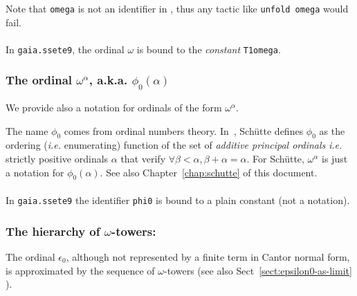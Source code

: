 \label{sect:omega-notation2}



Note that \texttt{omega} is not an identifier in \HydrasLib, thus any tactic like \texttt{unfold omega} would fail.

\paragraph*{\gaiasign}
In \texttt{gaia.ssete9}, the ordinal $\omega$ is bound to the \emph{constant}  \texttt{T1omega}.



\subsubsection{The ordinal \(\omega^\alpha\), a.k.a. \(\phi_0(\alpha)\)}
\label{sect:notation-phi0}
We provide also a notation for ordinals of the form $\omega^\alpha$.






\begin{remark}
\label{sec:orgheadline69}
The name \(\phi_0\)
   comes from ordinal numbers theory. In~\cite{schutte}, Schütte defines 
$\phi_0$  as the ordering (\emph{i.e.} enumerating) function of the set  of \emph{additive principal ordinals} \emph{i.e.} strictly positive ordinals $\alpha$ that verify $\forall \beta<\alpha, \beta+\alpha=\alpha$. For Schütte,  $\omega^\alpha$ is just a notation for $\phi_0(\alpha)$.  See also Chapter~\ref{chap:schutte} of this document.
\end{remark}

\paragraph*{\gaiasign}
In \texttt{gaia.ssete9} the identifier \texttt{phi0} is bound to a plain constant (not a notation).

  
\subsubsection{The hierarchy of \(\omega\)-towers:}
\label{sec:orgheadline71}

The ordinal $\epsilon_0$, although not represented by a finite term in Cantor normal form, is approximated by the sequence of $\omega$-towers (see also Sect~\vref{sect:epsilon0-as-limit} ).

